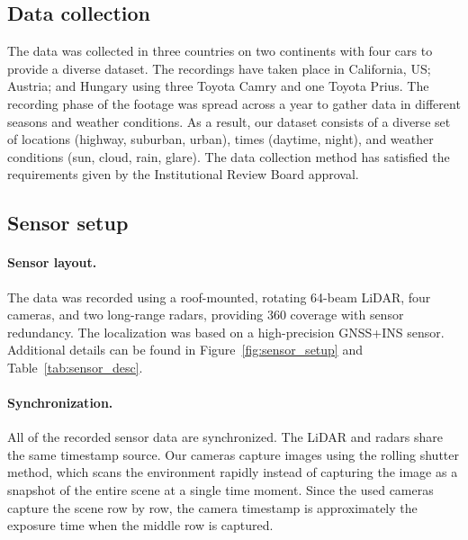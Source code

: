 \documentclass{article}
\begin{document}
\subsection{Data collection}
\label{datacoll}
The data was collected in three countries on two continents with four cars to provide a diverse dataset. The recordings have taken place in California, US; Austria; and Hungary using three Toyota Camry and one Toyota Prius. The recording phase of the footage was spread across a year to gather data in different seasons and weather conditions. As a result, our dataset consists of a diverse set of locations (highway, suburban, urban), times (daytime, night), and weather conditions (sun, cloud, rain, glare). The data collection method has satisfied the requirements given by the Institutional Review Board approval.

\subsection{Sensor setup}
\paragraph{Sensor layout.} The data was recorded using a roof-mounted, rotating 64-beam LiDAR, four cameras, and two long-range radars, providing 360 coverage with sensor redundancy. The localization was based on a high-precision GNSS+INS sensor. Additional details can be found in Figure~\ref{fig:sensor_setup} and Table~\ref{tab:sensor_desc}.

\paragraph{Synchronization.} All of the recorded sensor data are synchronized. The LiDAR and radars share the same timestamp source. Our cameras capture images using the rolling shutter method, which scans the environment rapidly instead of capturing the image as a snapshot of the entire scene at a single time moment. Since the used cameras capture the scene row by row, the camera timestamp is approximately the exposure time when the middle row is captured.
\end{document}
